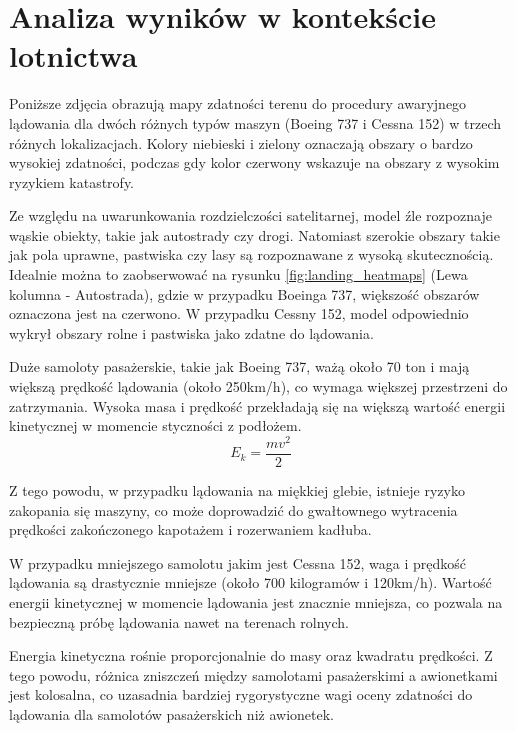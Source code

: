 \documentclass[12pt, a4paper]{report}
\begin{document}
\section{Analiza wyników w kontekście lotnictwa}
\par Poniższe zdjęcia obrazują mapy zdatności terenu do procedury awaryjnego lądowania dla dwóch różnych typów maszyn (Boeing 737 i Cessna 152) w trzech różnych lokalizacjach. Kolory niebieski i zielony oznaczają obszary o bardzo wysokiej zdatności, podczas gdy kolor czerwony wskazuje na obszary z wysokim ryzykiem katastrofy.
\par Ze względu na uwarunkowania rozdzielczości satelitarnej, model źle rozpoznaje wąskie obiekty, takie jak autostrady czy drogi. Natomiast szerokie obszary takie jak pola uprawne, pastwiska czy lasy są rozpoznawane z wysoką skutecznością. Idealnie można to zaobserwować na rysunku \ref{fig:landing_heatmaps} (Lewa kolumna - Autostrada), gdzie w przypadku Boeinga 737, większość obszarów oznaczona jest na czerwono. W przypadku Cessny 152, model odpowiednio wykrył obszary rolne i pastwiska jako zdatne do lądowania.
\par Duże samoloty pasażerskie, takie jak Boeing 737, ważą około 70 ton i mają większą prędkość lądowania (około 250km/h), co wymaga większej przestrzeni do zatrzymania. Wysoka masa i prędkość przekładają się na większą wartość energii kinetycznej w momencie styczności z podłożem. 
\begin{equation}
    E_k = \frac{mv^2}{2}
\end{equation}
\par Z tego powodu, w przypadku lądowania na miękkiej glebie, istnieje ryzyko zakopania się maszyny, co może doprowadzić do gwałtownego wytracenia prędkości zakończonego kapotażem i rozerwaniem kadłuba. 
\par W przypadku mniejszego samolotu jakim jest Cessna 152, waga i prędkość lądowania są drastycznie mniejsze (około 700 kilogramów i 120km/h). Wartość energii kinetycznej w momencie lądowania jest znacznie mniejsza, co pozwala na bezpieczną próbę lądowania nawet na terenach rolnych.
\par Energia kinetyczna rośnie proporcjonalnie do masy oraz kwadratu prędkości. Z tego powodu, różnica zniszczeń między samolotami pasażerskimi a awionetkami jest kolosalna, co uzasadnia bardziej rygorystyczne wagi oceny zdatności do lądowania dla samolotów pasażerskich niż awionetek.
\end{document}
